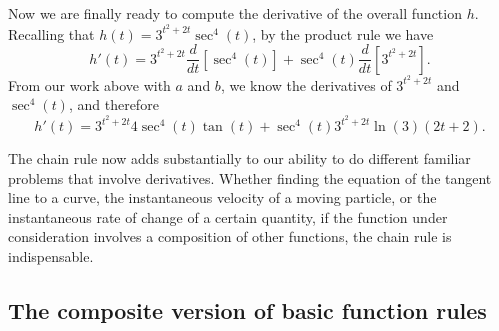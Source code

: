 Now we are finally ready to compute the derivative of the overall function $h$.  Recalling that $h(t) = 3^{t^2 + 2t}\sec^4(t)$, by the product rule we have
$$h'(t) = 3^{t^2 + 2t} \frac{d}{dt}[\sec^4(t)] + \sec^4(t) \frac{d}{dt}[3^{t^2 + 2t}].$$
From our work above with $a$ and $b$, we know the derivatives of $3^{t^2 + 2t}$ and $\sec^4(t)$, and therefore
$$h'(t) = 3^{t^2 + 2t} 4\sec^4(t) \tan(t) + \sec^4(t) 3^{t^2 + 2t}\ln(3) (2t+2).$$
\afterex



The chain rule now adds substantially to our ability to do different familiar problems that involve derivatives.  Whether finding the equation of the tangent line to a curve, the instantaneous velocity of a moving particle, or the instantaneous rate of change of a certain quantity, if the function under consideration involves a composition of other functions, the chain rule is indispensable.



\subsection*{The composite version of basic function rules}

